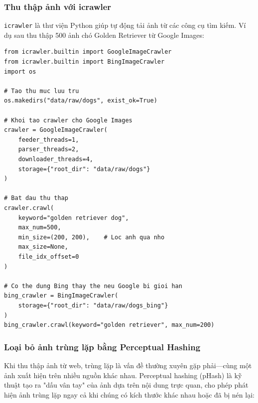 \subsubsection{Thu thập ảnh với icrawler}

\texttt{icrawler} là thư viện Python giúp tự động tải ảnh từ các công cụ tìm kiếm. Ví dụ sau thu thập 500 ảnh chó Golden Retriever từ Google Images:

\begin{verbatim}
from icrawler.builtin import GoogleImageCrawler
from icrawler.builtin import BingImageCrawler
import os

# Tao thu muc luu tru
os.makedirs("data/raw/dogs", exist_ok=True)

# Khoi tao crawler cho Google Images
crawler = GoogleImageCrawler(
    feeder_threads=1,
    parser_threads=2,
    downloader_threads=4,
    storage={"root_dir": "data/raw/dogs"}
)

# Bat dau thu thap
crawler.crawl(
    keyword="golden retriever dog",
    max_num=500,
    min_size=(200, 200),    # Loc anh qua nho
    max_size=None,
    file_idx_offset=0
)

# Co the dung Bing thay the neu Google bi gioi han
bing_crawler = BingImageCrawler(
    storage={"root_dir": "data/raw/dogs_bing"}
)
bing_crawler.crawl(keyword="golden retriever", max_num=200)
\end{verbatim}

\subsubsection{Loại bỏ ảnh trùng lặp bằng Perceptual Hashing}

Khi thu thập ảnh từ web, trùng lặp là vấn đề thường xuyên gặp phải---cùng một ảnh xuất hiện trên nhiều nguồn khác nhau. Perceptual hashing (pHash) là kỹ thuật tạo ra "dấu vân tay" của ảnh dựa trên nội dung trực quan, cho phép phát hiện ảnh trùng lặp ngay cả khi chúng có kích thước khác nhau hoặc đã bị nén lại:

